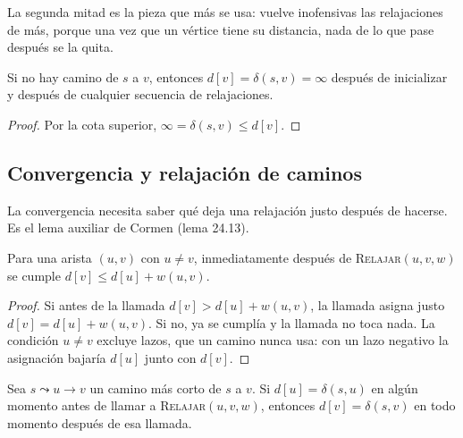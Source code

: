 \documentclass[11pt,letterpaper]{article}
\begin{document}
La segunda mitad es la pieza que más se usa: vuelve inofensivas las
relajaciones de más, porque una vez que un vértice tiene su distancia,
nada de lo que pase después se la quita.

\begin{corolario}
  \label{cor:prueba-sin-camino}
  Si no hay camino de $s$ a $v$, entonces
  $d[v] = \delta(s, v) = \infty$ después de inicializar y después de
  cualquier secuencia de relajaciones.
\end{corolario}

\begin{proof}
  Por la cota superior, $\infty = \delta(s, v) \le d[v]$.
\end{proof}


\subsection*{Convergencia y relajación de caminos}

La convergencia necesita saber qué deja una relajación justo después
de hacerse. Es el lema auxiliar de Cormen (lema 24.13).

\begin{lema}
  \label{lem:prueba-tras-relajar}
  Para una arista $(u, v)$ con $u \ne v$, inmediatamente después de
  \textsc{Relajar}$(u, v, w)$ se cumple
  $d[v] \le d[u] + w(u, v)$.
\end{lema}

\begin{proof}
  Si antes de la llamada $d[v] > d[u] + w(u, v)$, la llamada asigna
  justo $d[v] = d[u] + w(u, v)$. Si no, ya se cumplía y la llamada no
  toca nada. La condición $u \ne v$ excluye lazos, que un camino nunca
  usa: con un lazo negativo la asignación bajaría $d[u]$ junto con
  $d[v]$.
\end{proof}

\begin{lema}
  \label{lem:prueba-convergencia}
  Sea $s \leadsto u \to v$ un camino más corto de $s$ a $v$. Si
  $d[u] = \delta(s, u)$ en algún momento antes de llamar a
  \textsc{Relajar}$(u, v, w)$, entonces $d[v] = \delta(s, v)$ en todo
  momento después de esa llamada.
\end{lema}
\end{document}
